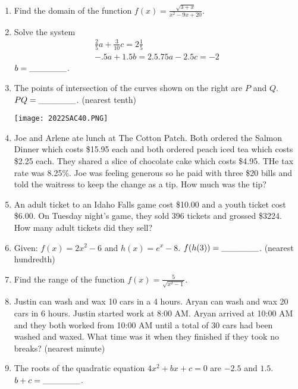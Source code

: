 \documentclass[../uilmath.tex]{subfiles}
\begin{document}
\begin{enumerate}[label=\bfseries\arabic*.]
    \item %
    Find the domain of the function $f(x)=\frac{\sqrt{3+x}}{x^2-9x+20}$.

    \item %
    Solve the system 
    \begin{align*}
        \frac{2}{5}a+\frac{3}{10}c=2\frac{1}{5}\\
        -.5a+1.5b=2.5
        .75a-2.5c=-2
    \end{align*}
    $b=\_\_\_\_\_\_$.

    \item %
    The points of intersection of the curves shown on the right are $P$ and $Q$. $PQ=\_\_\_\_\_\_$. (nearest tenth)
    \begin{center}
        \texttt{[image: 2022SAC40.PNG]}
    \end{center}

    \item %
    Joe and Arlene ate lunch at The Cotton Patch. Both ordered the Salmon Dinner which costs \$15.95 each and both 
    ordered peach iced tea which costs \$2.25 each. They shared a slice of chocolate cake which costs \$4.95. THe tax rate was 8.25\%.
    Joe was feeling generous so he paid with three \$20 bills and told the waitress to keep the change as a tip. How much was the tip?

    \item %
    An adult ticket to an Idaho Falls game cost \$10.00 and a youth ticket cost \$6.00. On Tuesday night's game, they sold 
    396 tickets and grossed \$3224. How many adult tickets did they sell?

    \item %
    Given: $f(x)=2x^2-6$ and $h(x)=e^x-8$. $f(h(3))=\_\_\_\_\_\_$. (nearest hundredth)

    \item %
    Find the range of the function $f(x)=\frac{5}{\sqrt{x^2-1}}$.

    \item %
    Justin can wash and wax 10 cars in a 4 hours. Aryan can wash and wax 20 cars in 6 hours. Justin started work at 8:00 AM.
    Aryan arrived at 10:00 AM and they both worked from 10:00 AM until a total of 30 cars had been washed and waxed. What time was it when they finished 
    if they took no breaks? (nearest minute)

    \item %
    The roots of the quadratic equation $4x^2+bx+c=0$ are $-2.5$ and $1.5$. $b+c=\_\_\_\_\_\_$.


\end{enumerate}
\end{document}
